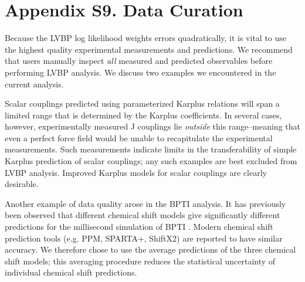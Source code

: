 \documentclass[journal=jacsat,manuscript=article]{achemso}
\begin{document}
\section{Appendix S9. Data Curation}

Because the LVBP log likelihood weights errors quadratically, it is vital to use the highest quality experimental measurements and predictions.  We recommend that users manually inspect \emph{all} measured and predicted observables before performing LVBP analysis.  We discuss two examples we encountered in the current analysis.  

Scalar couplings predicted using parameterized Karplus relations will span a limited range that is determined by the Karplus coefficients.  In several cases, however, experimentally measured J couplings lie \emph{outside} this range--meaning that even a perfect force field would be unable to recapitulate the experimental measurements.  Such measurements indicate limits in the transferability of simple Karplus prediction of scalar couplings; any such examples are best excluded from LVBP analysis.  Improved  Karplus models for scalar couplings are clearly desirable.  

Another example of data quality arose in the BPTI analysis.  It has previously been observed that different chemical shift models give significantly different predictions for the millisecond simulation of BPTI \cite{xue2012microsecond}.  Modern chemical shift prediction tools (e.g. PPM, SPARTA+, ShiftX2) are reported to have similar accuracy.  We therefore chose to use the average predictions of the three chemical shift models; this averaging procedure reduces the statistical uncertainty of individual chemical shift predictions.  

\newpage 
\end{document}
